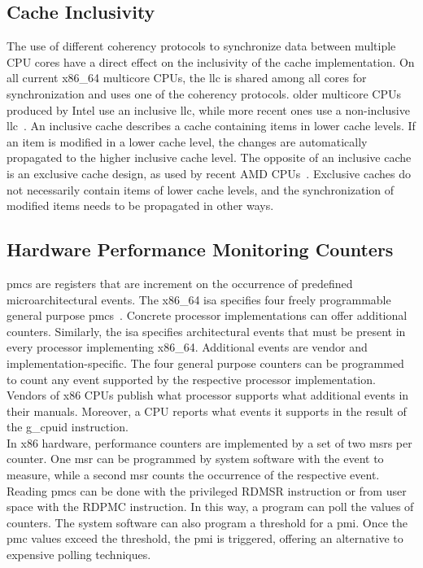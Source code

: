 \subsection{Cache Inclusivity}
\label{sec:state:technical:caches_inclusivity}
The use of different coherency protocols to synchronize data between multiple
CPU cores have a direct effect on the inclusivity of the cache implementation.
On all current x86\_64 multicore CPUs, the \gls{llc} is shared among all cores
for synchronization and uses one of the coherency protocols. older multicore
CPUs produced by Intel use an inclusive \gls{llc}, while more recent ones use a
non-inclusive \gls{llc}~\cite{intel_optimization, raptorlake_spec_sheet}. An
inclusive cache describes a cache containing items in lower cache levels. If an
item is modified in a lower cache level, the changes are automatically
propagated to the higher inclusive cache level. The opposite of an inclusive
cache is an exclusive cache design, as used by recent AMD
CPUs~\cite{amd_z4_optimization}. Exclusive caches do not necessarily contain
items of lower cache levels, and the synchronization of modified items needs to
be propagated in other ways.

\subsection{Hardware Performance Monitoring Counters}
\label{sec:state:technical:hpc}
\glspl{pmc} are registers that are increment on the occurrence of predefined
microarchitectural events. The x86\_64 \gls{isa} specifies four freely
programmable general purpose \glspl{pmc}~\cite{amd_manual}. Concrete processor
implementations can offer additional counters. Similarly, the \gls{isa}
specifies architectural events that must be present in every processor
implementing x86\_64. Additional events are vendor and implementation-specific.
The four general purpose counters can be programmed to count any event supported
by the respective processor implementation. Vendors of x86 CPUs publish what
processor supports what additional events in their manuals. Moreover, a CPU
reports what events it supports in the result of the \gls{g_cpuid} instruction.
\\

In x86 hardware, performance counters are implemented by a set of two
\glspl{msr} per counter. One \gls{msr} can be programmed by system software with
the event to measure, while a second \gls{msr} counts the occurrence of the
respective event. Reading \glspl{pmc} can be done with the privileged RDMSR
instruction or from user space with the RDPMC instruction. In this way, a
program can poll the values of counters. The system software can also program a
threshold for a \gls{pmi}. Once the \gls{pmc} values exceed the threshold, the
\gls{pmi} is triggered, offering an alternative to expensive polling
techniques.\\

